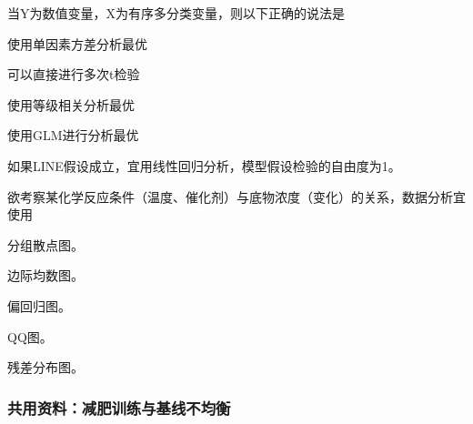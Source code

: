 \par\addvspace{6pt}\noindent\begin{minipage}{\linewidth}


当Y为数值变量，X为有序多分类变量，则以下正确的说法是


\begin{choices}

\item 使用单因素方差分析最优

\item 可以直接进行多次t检验

\item 使用等级相关分析最优

\item 使用GLM进行分析最优

\item 如果LINE假设成立，宜用线性回归分析，模型假设检验的自由度为1。

\end{choices}

\end{minipage}\par\vspace{4pt}

\par\addvspace{6pt}\noindent\begin{minipage}{\linewidth}


欲考察某化学反应条件（温度、催化剂）与底物浓度（变化）的关系，数据分析宜使用


\begin{choices}

\item 分组散点图。

\item 边际均数图。

\item 偏回归图。

\item QQ图。

\item 残差分布图。

\end{choices}

\end{minipage}\par\vspace{4pt}

\subsubsection*{共用资料：减肥训练与基线不均衡}

